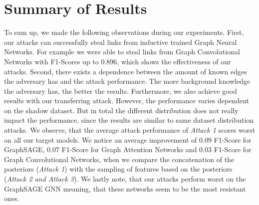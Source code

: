     \section{Summary of Results}
        To sum up, we made the following observations during our experiments.
        First, our attacks can successfully steal links from inductive trained Graph Neural Networks.
        For example we were able to steal links from Graph Convolutional Networks with F1-Scores up to $0.896$, which shows the effectiveness of our attacks.
        Second, there exists a dependence between the amount of known edges the adversary has and the attack performance. 
        The more background knowledge the adversary has, the better the results.
        Furthermore, we also achieve good results with our transferring attack.
        However, the performance varies dependent on the shadow dataset.
        But in total the different distribution does not really impact the performance, since the results are similar to same dataset distribution attacks. 
        We observe, that the average attack performance of \emph{Attack 1} scores worst on all our target models.
        We notice an average improvement of $0.09$ F1-Score for GraphSAGE, $0.07$ F1-Score for Graph Attention Networks and $0.03$ F1-Score for Graph Convolutional Networks, when we compare the concatenation of the posteriors (\emph{Attack 1}) with the sampling of features based on the posteriors (\emph{Attack 2 and Attack 3}).
        We lastly note, that our attacks perform worst on the GraphSAGE GNN meaning, that these networks seem to be the most resistant ones.

